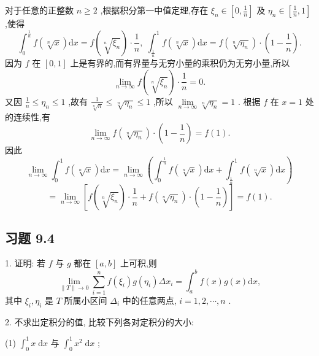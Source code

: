 \begin{solution}

\end{solution}
对于任意的正整数 \(n \geq  2\) ,根据积分第一中值定理,存在 \({\xi }_{n} \in  \left\lbrack  {0,\frac{1}{n}}\right\rbrack\) 及 \({\eta }_{n} \in  \left\lbrack  {\frac{1}{n},1}\right\rbrack\) ,使得
\[
{\int }_{0}^{\frac{1}{n}}f\left( \sqrt[n]{x}\right) \mathrm{d}x = f\left( \sqrt[n]{{\xi }_{n}}\right)  \cdot  \frac{1}{n},\;{\int }_{\frac{1}{n}}^{1}f\left( \sqrt[n]{x}\right) \mathrm{d}x = f\left( \sqrt[n]{{\eta }_{n}}\right)  \cdot  \left( {1 - \frac{1}{n}}\right) .
\]
因为 \(f\) 在 \(\left\lbrack  {0,1}\right\rbrack\) 上是有界的,而有界量与无穷小量的乘积仍为无穷小量,所以
\[
\mathop{\lim }\limits_{{n \rightarrow  \infty }}f\left( \sqrt[n]{{\xi }_{n}}\right)  \cdot  \frac{1}{n} = 0.
\]
又因 \(\frac{1}{n} \leq  {\eta }_{n} \leq  1\) ,故有 \(\frac{1}{\sqrt[n]{n}} \leq  \sqrt[n]{{\eta }_{n}} \leq  1\) ,所以 \(\mathop{\lim }\limits_{{n \rightarrow  \infty }}\sqrt[n]{{\eta }_{n}} = 1\) . 根据 \(f\) 在 \(x = 1\) 处的连续性,有
\[
\mathop{\lim }\limits_{{n \rightarrow  \infty }}f\left( \sqrt[n]{{\eta }_{n}}\right)  \cdot  \left( {1 - \frac{1}{n}}\right)  = f\left( 1\right) .
\]
因此
\[
\mathop{\lim }\limits_{{n \rightarrow  \infty }}{\int }_{0}^{1}f\left( \sqrt[n]{x}\right) \mathrm{d}x = \mathop{\lim }\limits_{{n \rightarrow  \infty }}\left( {{\int }_{0}^{\frac{1}{n}}f\left( \sqrt[n]{x}\right) \mathrm{d}x + {\int }_{\frac{1}{n}}^{1}f\left( \sqrt[n]{x}\right) \mathrm{d}x}\right)
\]
\[
= \mathop{\lim }\limits_{{n \rightarrow  \infty }}\left\lbrack  {f\left( \sqrt[n]{{\xi }_{n}}\right)  \cdot  \frac{1}{n} + f\left( \sqrt[n]{{\eta }_{n}}\right)  \cdot  \left( {1 - \frac{1}{n}}\right) }\right\rbrack   = f\left( 1\right) .
\]
\subsection{习题 9.4}

1. 证明: 若 \(f\) 与 \(g\) 都在 \(\left\lbrack  {a,b}\right\rbrack\) 上可积,则
\[
\mathop{\lim }\limits_{{\parallel T\parallel  \rightarrow  0}}\mathop{\sum }\limits_{{i = 1}}^{n}f\left( {\xi }_{i}\right) g\left( {\eta }_{i}\right) \Delta {x}_{i} = {\int }_{a}^{b}f\left( x\right) g\left( x\right) \mathrm{d}x,
\]
其中 \({\xi }_{i},{\eta }_{i}\) 是 \(T\) 所属小区间 \({\Delta }_{i}\) 中的任意两点, \(i = 1,2,\cdots ,n\) .

2. 不求出定积分的值, 比较下列各对定积分的大小:

(1) \({\int }_{0}^{1}x\mathrm{\;d}x\) 与 \({\int }_{0}^{1}{x}^{2}\mathrm{\;d}x\) ;

